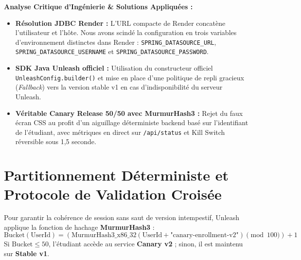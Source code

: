 \documentclass[11pt, a4paper, openany]{report}
\begin{document}
\begin{engSolutionBox}
\textbf{Analyse Critique d'Ingénierie \& Solutions Appliquées :}
\begin{itemize}[label=\textbullet, itemsep=2pt]
    \item \textbf{Résolution JDBC Render :} L'URL compacte de Render concatène l'utilisateur et l'hôte. Nous avons scindé la configuration en trois variables d'environnement distinctes dans Render : \texttt{SPRING\_DATASOURCE\_URL}, \texttt{SPRING\_DATASOURCE\_USERNAME} et \texttt{SPRING\_DATASOURCE\_PASSWORD}.
    \item \textbf{SDK Java Unleash officiel :} Utilisation du constructeur officiel \texttt{UnleashConfig.builder()} et mise en place d'une politique de repli gracieux (\textit{Fallback}) vers la version stable v1 en cas d'indisponibilité du serveur Unleash.
    \item \textbf{Véritable Canary Release 50/50 avec MurmurHash3 :} Rejet du faux écran CSS au profit d'un aiguillage déterministe backend basé sur l'identifiant de l'étudiant, avec métriques en direct sur \texttt{/api/status} et Kill Switch réversible sous 1,5 seconde.
\end{itemize}
\end{engSolutionBox}

\section{Partitionnement Déterministe et Protocole de Validation Croisée}
Pour garantir la cohérence de session sans saut de version intempestif, Unleash applique la fonction de hachage \textbf{MurmurHash3} :
\begin{equation}
\text{Bucket}(\text{UserId}) = \left( \text{MurmurHash3\_x86\_32}(\text{UserId} + \text{"canary-enrollment-v2"}) \pmod{100} \right) + 1
\end{equation}
Si $\text{Bucket} \le 50$, l'étudiant accède au service \textbf{Canary v2} ; sinon, il est maintenu sur \textbf{Stable v1}.
\end{document}
